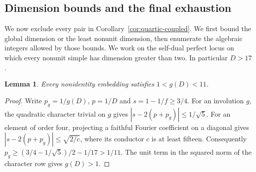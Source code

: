 \documentclass[11pt,a4paper]{article}
\newtheorem{lemma}[theorem]{Lemma}
\numberwithin{equation}{section}
\begin{document}
\subsection{Dimension bounds and the final exhaustion}\label{sec:quartic-exhaustion}
We now exclude every pair in Corollary~\ref{cor:quartic-coupled}. We first bound the global dimension or the least nonunit dimension, then enumerate the algebraic integers allowed by those bounds.
We work on the self-dual perfect locus on which every nonunit simple has dimension greater than two. In particular $D>17$.
\begin{lemma}\label{lem:quartic-conjugates}
Every nonidentity embedding satisfies $1<g(D)<11$.
\end{lemma}
\begin{proof}
Write $p_g=1/g(D)$, $p=1/D$ and $s=1-1/f\ge3/4$.
For an involution $g$, the quadratic character trivial on $g$ gives
$|s-2(p+p_g)|\le1/\sqrt5$. For an element of order four, projecting a faithful Fourier coefficient on a diagonal gives $|s-2(p+p_g)|\le\sqrt{2/c}$, where its conductor $c$ is at least fifteen.
Consequently $p_g\ge(3/4-1/\sqrt5)/2-1/17>1/11$. The unit term in the squared norm of the character row gives $g(D)>1$.
\end{proof}
\end{document}
